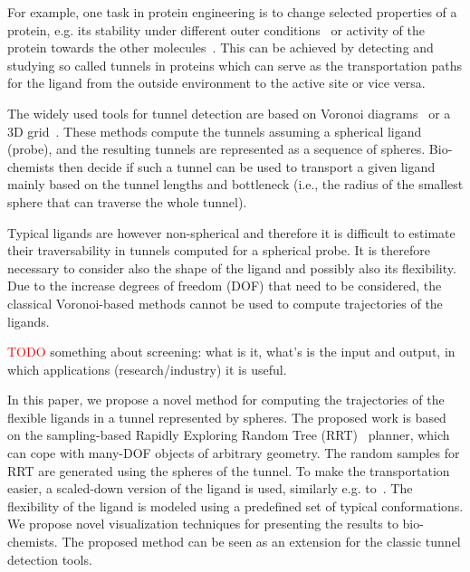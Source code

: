 \documentclass{svmult}
\newcommand{\red}[1]{\textcolor{red}{#1}}
\begin{document}
For example, one task in protein engineering is to change selected properties of a protein, e.g. its stability under different outer conditions~\cite{Koudelakova2013} or activity of the protein towards the other molecules~\cite{Pavlova2009}.
This can be achieved by detecting and studying so called tunnels in proteins which can serve as the transportation paths for the 
ligand from the outside environment to the active site or vice versa. 

The widely used tools for tunnel detection are based on Voronoi diagrams~\cite{yaffe2008,caver3} or 
a 3D grid~\cite{sehnal2013mole,petrek2006caver}.
These methods compute the tunnels assuming a spherical ligand (probe), and the resulting tunnels are represented as a sequence of spheres.
Bio-chemists then decide if such a tunnel can be used to transport a given ligand mainly based on the tunnel lengths and bottleneck (i.e.,
        the radius of the smallest sphere that can traverse the whole tunnel).

Typical ligands are however non-spherical and therefore it is difficult to estimate their traversability in tunnels
computed for a spherical probe.
It is therefore necessary to consider also the shape of the ligand and possibly also its flexibility.
Due to the increase degrees of freedom (DOF) that need to be considered, the classical Voronoi-based methods cannot be used 
to compute trajectories of the ligands.

\red{TODO}
something about screening: what is it, what's is the input and output, in which applications (research/industry) it is useful.

In this paper, we propose a novel method for computing the trajectories of the flexible ligands in a tunnel represented by spheres.
The proposed work is based on the sampling-based Rapidly Exploring Random Tree (RRT)~\cite{lavalleRRT} planner, which
can cope with many-DOF objects of arbitrary geometry.
The random samples for RRT are generated using the spheres of the tunnel.
To make the transportation easier, a scaled-down version of the ligand is used, similarly e.g. to~\cite{cortes2005path}.
The flexibility of the ligand is modeled using a predefined set of typical conformations.
We propose novel visualization techniques for presenting the results to bio-chemists.
The proposed method can be seen as an extension for the classic tunnel detection tools.
\end{document}
